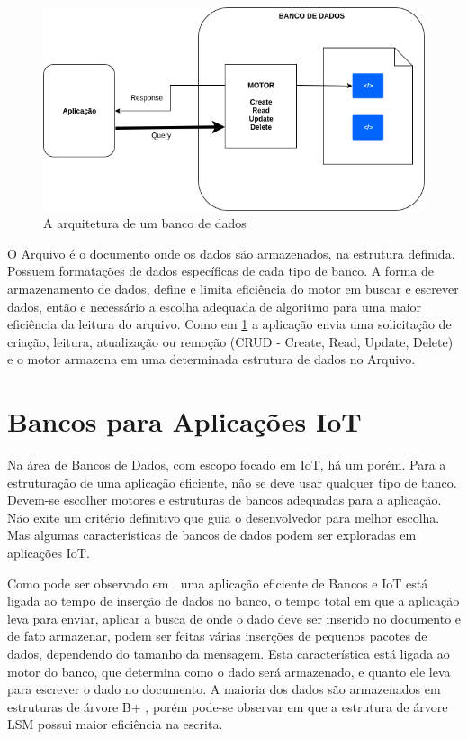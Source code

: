 \begin{figure}[h!]
\centering
\includegraphics[width=12cm]{./02_Capitulos/02_Cap3/figures/Database_Arch}
\caption{A arquitetura de um banco de dados}
\label{fig:3.3.5/database_arch}
\end{figure}

O Arquivo é o documento onde os dados são armazenados, na estrutura definida. Possuem formatações de dados específicas de cada tipo de banco. A forma de armazenamento de dados, define e limita eficiência do motor em buscar e escrever dados, então e necessário a escolha adequada de algoritmo para uma maior eficiência da leitura do arquivo. Como em \ref{fig:3.3.5/database_arch} a aplicação envia uma solicitação de criação, leitura, atualização ou remoção (CRUD - Create, Read, Update, Delete) e o motor armazena em uma determinada estrutura de dados no Arquivo.


 
\section{Bancos para Aplicações IoT}
\label{section:bancos_IoT}

Na área de Bancos de Dados, com escopo focado em IoT, há um porém. Para a estruturação de uma aplicação eficiente, não se deve usar qualquer tipo de banco. Devem-se escolher motores e estruturas de bancos adequadas para a aplicação. Não exite um critério definitivo que guia o desenvolvedor para melhor escolha. Mas algumas características de bancos de dados podem ser exploradas em aplicações IoT.

Como pode ser observado em \cite{Damodaran}, uma aplicação eficiente de Bancos e IoT está ligada ao tempo de inserção de dados no banco,  o tempo total em que a aplicação leva para enviar, aplicar a busca de onde o dado deve ser inserido no documento e de fato armazenar, podem ser feitas várias inserções de pequenos pacotes de dados, dependendo do tamanho da mensagem. Esta característica está ligada ao motor do banco, que determina como o dado será armazenado, e quanto ele leva para escrever o dado no documento. A maioria dos dados são armazenados em estruturas de árvore B+ \cite{b-tree}, porém pode-se observar em \cite{Damodaran} que a estrutura de árvore LSM  \cite{O'Neal-Gawlick-Cheng} possui maior eficiência na escrita.


